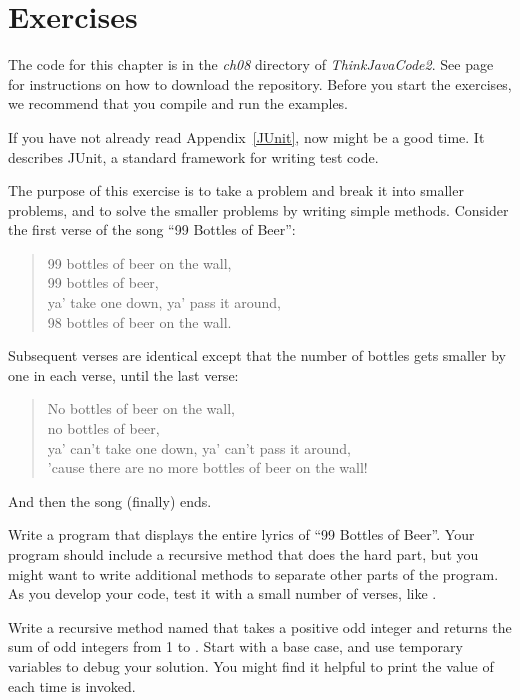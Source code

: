 \section{Exercises}

The code for this chapter is in the {\it ch08} directory of {\it ThinkJavaCode2}.
See page~\pageref{code} for instructions on how to download the repository.
Before you start the exercises, we recommend that you compile and run the examples.

If you have not already read Appendix~\ref{JUnit}, now might be a good time.
It describes JUnit, a standard framework for writing test code.


\begin{exercise}  %

The purpose of this exercise is to take a problem and break it into smaller problems, and to solve the smaller problems by writing simple methods.
Consider the first verse of the song ``99 Bottles of Beer'':

\begin{quote}
99 bottles of beer on the wall,\\
99 bottles of beer,\\
ya' take one down, ya' pass it around,\\
98 bottles of beer on the wall.
\end{quote}

Subsequent verses are identical except that the number of bottles gets smaller by one in each verse, until the last verse:

\begin{quote}
No bottles of beer on the wall,\\
no bottles of beer,\\
ya' can't take one down, ya' can't pass it around,\\
'cause there are no more bottles of beer on the wall!
\end{quote}

And then the song (finally) ends.

Write a program that displays the entire lyrics of ``99 Bottles of Beer''.
Your program should include a recursive method that does the hard part, but you might want to write additional methods to separate other parts of the program.
As you develop your code, test it with a small number of verses, like .

\end{exercise}


\begin{exercise}  %

Write a recursive method named  that takes a positive odd integer  and returns the sum of odd integers from 1 to .
Start with a base case, and use temporary variables to debug your solution.
You might find it helpful to print the value of  each time  is invoked.

\end{exercise}


